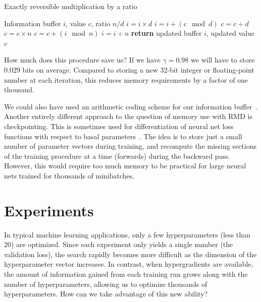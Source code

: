 \documentclass{article}
\newcommand{\primal}{basal}
\newcommand{\decay}{\gamma}
\begin{document}
\begin{algorithm}
   \caption{Exactly reversible multiplication by a ratio}
   \label{alg:reversible-mult}
\begin{algorithmic}[1]
    Information buffer $i$, value $c$, ratio $n / d$
   \State $i = i \times d$                \label{step:f1}
   \State $i = i + (c \! \mod d)$    \label{step:f2}
   \State $c = c \div d$                    \label{step:f3}
   \State $c = c \times n$                  \label{step:b1}
   \State $c = c +  (i \! \mod n)$          \label{step:b2}
   \State $i = i \div n$               \label{step:b3}
   \State \textbf{return} updated buffer $i$, updated value $c$
\end{algorithmic}
\end{algorithm}

How much does this procedure save us? If we have $\decay =  0.98$ we will have
to store $0.029$ bits on average. Compared to storing a new 32-bit integer or
floating-point number at each iteration, this reduces memory requirements by a factor of one thousand.

We could also have used an arithmetic coding scheme for our information
buffer~\citep{steinruecken2014a}. Another entirely different approach to the question
of memory use with RMD is checkpointing. This is sometimes used for
differentiation of neural net loss functions with respect to {\primal}
parameters~\citep{martens2012training}. The idea is to store just a small number
of parameter vectors during training, and recompute the missing sections of the training
procedure at a time (forwards) during the backward pass. However, this would
require too much memory to be practical for large neural nets trained for
thousands of minibatches.

\section{Experiments}
\label{sec:experiments}


In typical machine learning applications, only a few hyperparameters (less than 20) are optimized.
Since each experiment only yields a single number (the validation loss), the search rapidly becomes more difficult as the dimension of the hyperparameter vector increases.
In contrast, when hypergradients are available, the amount of information gained from each training run grows along with the number of hyperparameters, allowing us to optimize thousands of hyperparameters. %
How can we take advantage of this new ability?
\end{document}
